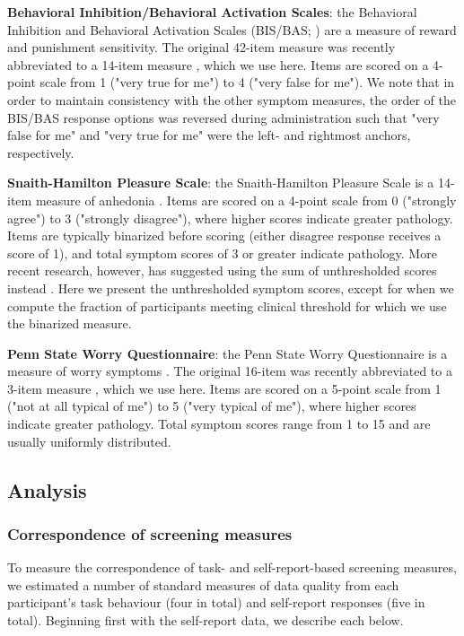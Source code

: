 \documentclass[a4paper,notitlepage,12pt]{article}
\begin{document}
\textbf{Behavioral Inhibition/Behavioral Activation Scales}: the Behavioral Inhibition and Behavioral Activation Scales (BIS/BAS; \cite{carver1994behavioral}) are a measure of reward and punishment sensitivity. The original 42-item measure was recently abbreviated to a 14-item measure \cite{pagliaccio2016revising}, which we use here. Items are scored on a 4-point scale from 1 ("very true for me") to 4 ("very false for me"). We note that in order to maintain consistency with the other symptom measures, the order of the BIS/BAS response options was reversed during administration such that "very false for me" and "very true for me" were the left- and rightmost anchors, respectively. 

\textbf{Snaith-Hamilton Pleasure Scale}: the Snaith-Hamilton Pleasure Scale is a 14-item measure of anhedonia \cite{snaith1995scale}. Items are scored on a 4-point scale from 0 ("strongly agree") to 3 ("strongly disagree"), where higher scores indicate greater pathology. Items are typically binarized before scoring (either disagree response receives a score of 1), and total symptom scores of 3 or greater indicate pathology. More recent research, however, has suggested using the sum of unthresholded scores instead \cite{franken2007assessment}. Here we present the unthresholded symptom scores, except for when we compute the fraction of participants meeting clinical threshold for which we use the binarized measure. 

\textbf{Penn State Worry Questionnaire}: the Penn State Worry Questionnaire is a measure of worry symptoms \cite{meyer1990development}. The original 16-item was recently abbreviated to a 3-item measure \cite{kertz2014psychometric}, which we use here. Items are scored on a 5-point scale from 1 ("not at all typical of me") to 5 ("very typical of me"), where higher scores indicate greater pathology. Total symptom scores range from 1 to 15 and are usually uniformly distributed.

\subsection{Analysis}

\subsubsection{Correspondence of screening measures}

To measure the correspondence of task- and self-report-based screening measures, we estimated a number of standard measures of data quality from each participant's task behaviour (four in total) and self-report responses (five in total). Beginning first with the self-report data, we describe each below.
\end{document}
